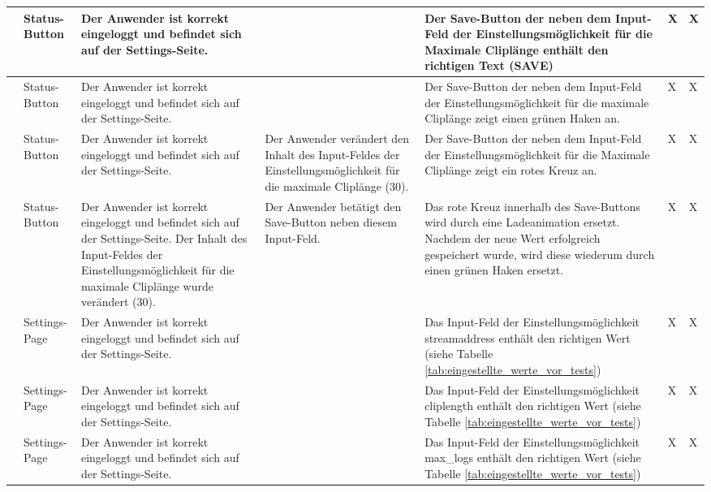 \begin{longtable}{| p{} | p{} | p{} | p{} | p{} | p{} | p{} |}
	\stepcounter{TestNumber}\arabic{TestNumber} & Status-Button & Der Anwender ist korrekt eingeloggt und befindet sich auf der Settings-Seite. & & Der Save-Button der neben dem Input-Feld der Einstellungsmöglichkeit für die Maximale Cliplänge enthält den richtigen Text (SAVE) & X & X \\ \hline
	
	\stepcounter{TestNumber}\arabic{TestNumber} & Status-Button & Der Anwender ist korrekt eingeloggt und befindet sich auf der Settings-Seite. & & Der Save-Button der neben dem Input-Feld der Einstellungsmöglichkeit für die maximale Cliplänge zeigt einen grünen Haken an. & X & X \\ \hline
	
	\stepcounter{TestNumber}\arabic{TestNumber} & Status-Button & Der Anwender ist korrekt eingeloggt und befindet sich auf der Settings-Seite. & Der Anwender verändert den Inhalt des Input-Feldes der Einstellungsmöglichkeit für die maximale Cliplänge (30). & Der Save-Button der neben dem Input-Feld der Einstellungsmöglichkeit für die Maximale Cliplänge zeigt ein rotes Kreuz an. & X & X \\ \hline
	
	\stepcounter{TestNumber}\arabic{TestNumber} & Status-Button & Der Anwender ist korrekt eingeloggt und befindet sich auf der Settings-Seite. Der Inhalt des Input-Feldes der Einstellungsmöglichkeit für die maximale Cliplänge wurde verändert (30). & Der Anwender betätigt den Save-Button neben diesem Input-Feld. & Das rote Kreuz innerhalb des Save-Buttons wird durch eine Ladeanimation ersetzt. Nachdem der neue Wert erfolgreich gespeichert wurde, wird diese wiederum durch einen grünen Haken ersetzt. & X & X \\ \hline
	
	\stepcounter{TestNumber}\arabic{TestNumber} & Settings-Page & Der Anwender ist korrekt eingeloggt und befindet sich auf der Settings-Seite. & & Das Input-Feld der Einstellungsmöglichkeit streamaddress enthält den richtigen Wert (siehe Tabelle \ref{tab:eingestellte_werte_vor_tests}) & X & X \\ \hline
	
	\stepcounter{TestNumber}\arabic{TestNumber} & Settings-Page & Der Anwender ist korrekt eingeloggt und befindet sich auf der Settings-Seite. & & Das Input-Feld der Einstellungsmöglichkeit cliplength enthält den richtigen Wert (siehe Tabelle \ref{tab:eingestellte_werte_vor_tests}) & X & X \\ \hline
	
	\stepcounter{TestNumber}\arabic{TestNumber} & Settings-Page & Der Anwender ist korrekt eingeloggt und befindet sich auf der Settings-Seite. & & Das Input-Feld der Einstellungsmöglichkeit max\_logs enthält den richtigen Wert (siehe Tabelle \ref{tab:eingestellte_werte_vor_tests}) & X & X \\ \hline
	

\end{longtable}
